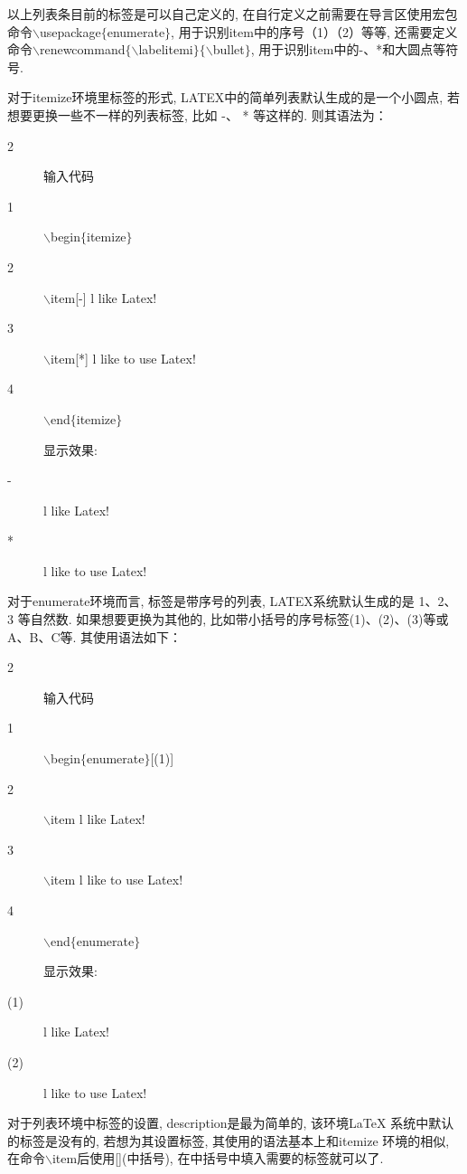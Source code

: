 以上列表条目前的标签是可以自己定义的, 在自行定义之前需要在导言区使用宏包命令$\backslash$usepackage$\{$enumerate$\}$, 用于识别item中的序号（1）（2）等等, 还需要定义命令$\backslash$renewcommand$\{\backslash$labelitemi$\}\{\backslash$bullet$\}$,
用于识别item中的-、*和大圆点等符号.


对于itemize环境里标签的形式, LATEX中的简单列表默认生成的是一个小圆点, 若想要更换一些不一样的列表标签,  比如 -、 * 等这样的. 则其语法为：
 \begin{multicols}{2}
\begin{description}
    \item[] 输入代码
  \item[1]$\backslash$begin$\{$itemize$\}$
  \item[2]$\backslash$item[-] l like Latex!
  \item[3]$\backslash$item[*] l like to use Latex!
  \item[4]$\backslash$end$\{$itemize$\}$
    \item[]显示效果:
\item[-] l like Latex!
\item[*] l like to use Latex!
\item[]
\item[]
\end{description}
\end{multicols}
对于enumerate环境而言, 标签是带序号的列表, LATEX系统默认生成的是 1、2、3 等自然数. 如果想要更换为其他的, 比如带小括号的序号标签(1)、(2)、(3)等或A、B、C等. 其使用语法如下：
 \begin{multicols}{2}
\begin{description}
    \item[]输入代码
  \item[1]$\backslash$begin$\{$enumerate$\}$[(1)]
  \item[2]$\backslash$item l like Latex!
  \item[3]$\backslash$item l like to use Latex!
  \item[4]$\backslash$end$\{$enumerate$\}$
    \item[]显示效果:
\item[(1)] l like Latex!
\item[(2)] l like to use Latex!
\item[]
\item[]
\end{description}
\end{multicols}
对于列表环境中标签的设置, description是最为简单的, 该环境\LaTeX{} 系统中默认的标签是没有的, 若想为其设置标签, 其使用的语法基本上和itemize 环境的相似, 在命令$\backslash$item后使用[](中括号), 在中括号中填入需要的标签就可以了.

